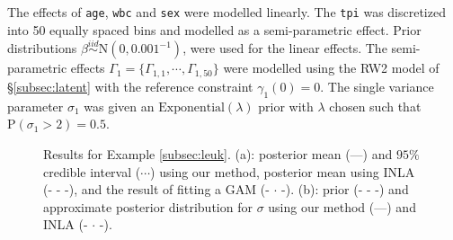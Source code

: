 \documentclass[num-refs,serif,10pt]{wiley-article}
\begin{document}
The effects of \texttt{age}, \texttt{wbc} and \texttt{sex} were modelled linearly. The \texttt{tpi} was discretized into 50 equally spaced bins and modelled as a semi-parametric effect. Prior distributions $\beta \stackrel{iid}{\sim} \text{N}(0, 0.001^{-1})$, were used for the linear effects. The semi-parametric effects $\Gamma_1 = \{\Gamma_{1,1}, \cdots, \Gamma_{1,50}\}$ were modelled using the RW2 model of \S\ref{subsec:latent} with the reference constraint $\gamma_{1}(0) = 0$. The single variance parameter $\sigma_{1}$ was given an $\text{Exponential}(\lambda)$ prior with $\lambda$ chosen such that $\text{P}(\sigma_{1} > 2) = 0.5$. 

\begin{figure}[ht]
\centering
{}
\caption{Results for Example \ref{subsec:leuk}. (a): posterior mean (---) and $95\%$ credible interval ($\cdots$) using our method, posterior mean using INLA (- - -), and the result of fitting a GAM (- $\cdot$ -). (b): prior (- - -) and approximate posterior distribution for $\sigma$ using our method (---) and INLA (- $\cdot$ -).}
\label{fig:leuk}
\end{figure}
\end{document}
